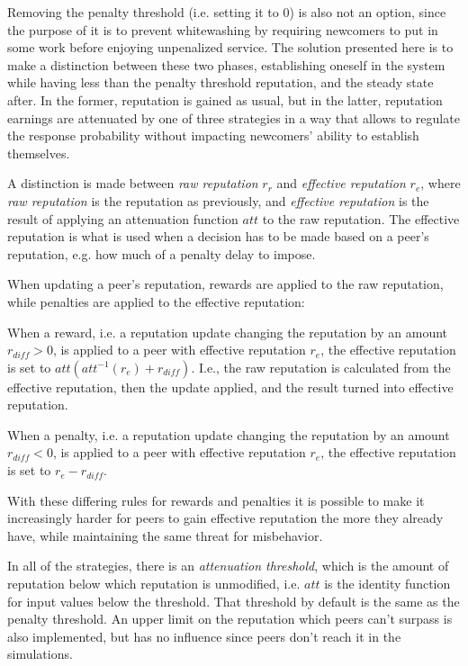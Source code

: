 Removing the penalty threshold (i.e. setting it to 0) is also not an option,
since the purpose of it is to prevent whitewashing by requiring newcomers to put
in some work before enjoying unpenalized service. The solution presented here is
to make a distinction between these two phases, establishing oneself in the
system while having less than the penalty threshold reputation, and the steady
state after. In the former, reputation is gained as usual, but in the latter,
reputation earnings are attenuated by one of three strategies in a way that
allows to regulate the response probability without impacting newcomers' ability
to establish themselves.

A distinction is made between \emph{raw reputation} $r_r$ and \emph{effective
reputation} $r_e$, where \emph{raw reputation} is the reputation as previously,
and \emph{effective reputation} is the result of applying an attenuation
function $att$ to the raw reputation. The effective reputation is what is used
when a decision has to be made based on a peer's reputation, e.g. how much of a
penalty delay to impose.

When updating a peer's reputation, rewards are applied to the raw reputation,
while penalties are applied to the effective reputation:

When a reward, i.e. a reputation update changing the reputation by an amount
$r_{diff} > 0$, is applied to a peer with effective reputation $r_e$, the
effective reputation is set to $att(att^{-1}(r_e) + r_{diff})$. I.e., the raw
reputation is calculated from the effective reputation, then the update applied,
and the result turned into effective reputation.

When a penalty, i.e. a reputation update changing the reputation by an amount
$r_{diff} < 0$, is applied to a peer with effective reputation $r_e$, the
effective reputation is set to $r_e - r_{diff}$.

With these differing rules for rewards and penalties it is possible to make it
increasingly harder for peers to gain effective reputation the more they already
have, while maintaining the same threat for misbehavior.

In all of the strategies, there is an \emph{attenuation threshold}, which is the
amount of reputation below which reputation is unmodified, i.e. $att$ is the
identity function for input values below the threshold. That threshold by
default is the same as the penalty threshold. An upper limit on the reputation
which peers can't surpass is also implemented, but has no influence since peers
don't reach it in the simulations.

